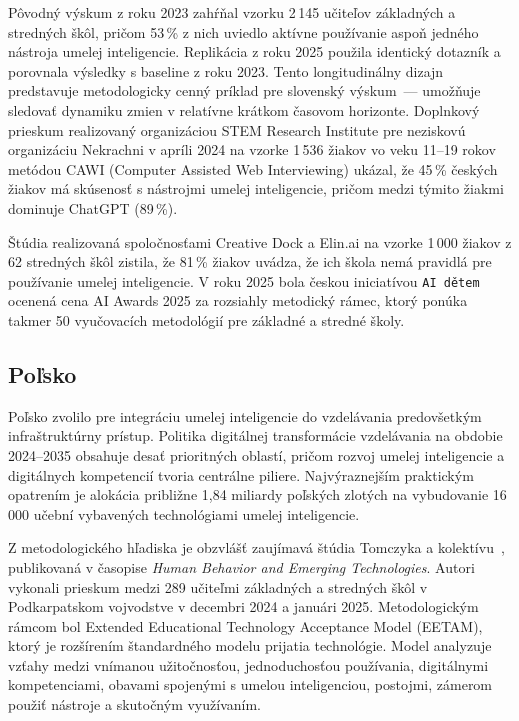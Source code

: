 Pôvodný výskum z roku 2023 zahŕňal vzorku 2\,145 učiteľov základných a stredných škôl, pričom 53\,\% z nich uviedlo aktívne používanie aspoň jedného nástroja umelej inteligencie. Replikácia z roku 2025 použila identický dotazník a porovnala výsledky s baseline z roku 2023. Tento longitudinálny dizajn predstavuje metodologicky cenný príklad pre slovenský výskum~--- umožňuje sledovať dynamiku zmien v relatívne krátkom časovom horizonte. Doplnkový prieskum realizovaný organizáciou STEM Research Institute pre neziskovú organizáciu Nekrachni v apríli 2024 na vzorke 1\,536 žiakov vo veku 11--19 rokov metódou CAWI (Computer Assisted Web Interviewing) ukázal, že 45\,\% českých žiakov má skúsenosť s nástrojmi umelej inteligencie, pričom medzi týmito žiakmi dominuje ChatGPT (89\,\%).

Štúdia realizovaná spoločnosťami Creative Dock a Elin.ai na vzorke 1\,000 žiakov z 62 stredných škôl zistila, že 81\,\% žiakov uvádza, že ich škola nemá pravidlá pre používanie umelej inteligencie. V roku 2025 bola českou iniciatívou \texttt{AI dětem} ocenená cena AI Awards 2025 za rozsiahly metodický rámec, ktorý ponúka takmer 50 vyučovacích metodológií pre základné a stredné školy.


\subsection{Poľsko}

Poľsko zvolilo pre integráciu umelej inteligencie do vzdelávania predovšetkým infraštruktúrny prístup. Politika digitálnej transformácie vzdelávania na obdobie 2024--2035 obsahuje desať prioritných oblastí, pričom rozvoj umelej inteligencie a digitálnych kompetencií tvoria centrálne piliere. Najvýraznejším praktickým opatrením je alokácia približne 1,84 miliardy poľských zlotých na vybudovanie 16\,000 učební vybavených technológiami umelej inteligencie.

Z metodologického hľadiska je obzvlášť zaujímavá štúdia Tomczyka a kolektívu~\cite{tomczyk2025polish}, publikovaná v časopise \textit{Human Behavior and Emerging Technologies}. Autori vykonali prieskum medzi 289 učiteľmi základných a stredných škôl v Podkarpatskom vojvodstve v decembri 2024 a januári 2025. Metodologickým rámcom bol Extended Educational Technology Acceptance Model (EETAM), ktorý je rozšírením štandardného modelu prijatia technológie. Model analyzuje vzťahy medzi vnímanou užitočnosťou, jednoduchosťou používania, digitálnymi kompetenciami, obavami spojenými s umelou inteligenciou, postojmi, zámerom použiť nástroje a skutočným využívaním.

